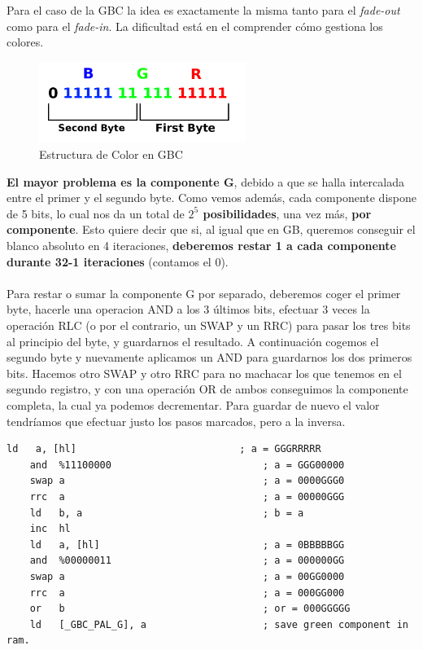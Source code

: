 Para el caso de la GBC la idea es exactamente la misma tanto para el \textit{fade-out} como para el \textit{fade-in}. La dificultad está en el comprender cómo gestiona los colores.

\begin{figure}[h]
\centering
\includegraphics[width=0.6\textwidth]{include/images/desarrollo/gbcpalcolor.png}
\caption{Estructura de Color en GBC}
\label{figure:colorstructure}
\end{figure}

\textbf{El mayor problema es la componente G}, debido a que se halla intercalada entre el primer y el segundo byte. Como vemos además, cada componente dispone de 5 bits, lo cual nos da un total de \textbf{\(2^5\) posibilidades}, una vez más, \textbf{por componente}. Esto quiere decir que si, al igual que en GB, queremos conseguir el blanco absoluto en 4 iteraciones, \textbf{deberemos restar 1 a cada componente durante 32-1 iteraciones} (contamos el 0).
\\ \\
Para restar o sumar la componente G por separado, deberemos coger el primer byte, hacerle una operacion AND a los 3 últimos bits, efectuar 3 veces la operación RLC (o por el contrario, un SWAP y un RRC) para pasar los tres bits al principio del byte, y guardarnos el resultado. A continuación cogemos el segundo byte y nuevamente aplicamos un AND para guardarnos los dos primeros bits. Hacemos otro SWAP y otro RRC para no machacar los que tenemos en el segundo registro, y con una operación OR de ambos conseguimos la componente completa, la cual ya podemos decrementar. Para guardar de nuevo el valor tendríamos que efectuar justo los pasos marcados, pero a la inversa.

\begin{lstlisting}[caption={Conseguir Componente G de la Paleta de Color en GBC}, label={code:gcomponent}]
	ld   a, [hl] 							; a = GGGRRRRR
    and  %11100000	 						; a = GGG00000
    swap a 									; a = 0000GGG0
    rrc  a 									; a = 00000GGG
    ld   b, a 								; b = a
    inc  hl
    ld   a, [hl] 							; a = 0BBBBBGG
    and  %00000011 							; a = 000000GG
    swap a 									; a = 00GG0000
    rrc  a 									; a = 000GG000
    or   b 									; or = 000GGGGG
    ld   [_GBC_PAL_G], a 					; save green component in ram.
\end{lstlisting}

